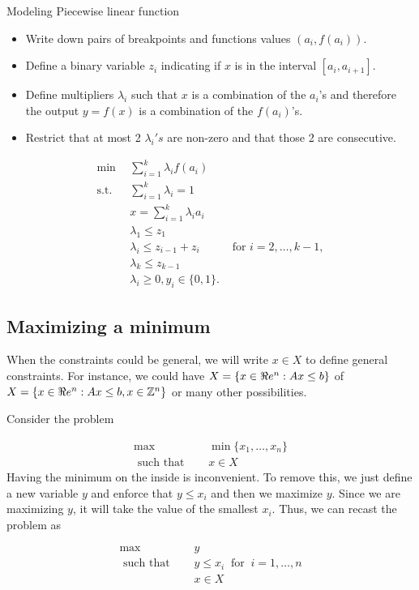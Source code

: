 {Modeling Piecewise linear function}
{\begin{itemize}
\item Write down pairs of breakpoints and functions values $(a_i, f(a_i))$.
\item Define a binary variable $z_i$ indicating if $x$ is in the interval $[a_i, a_{i+1}]$.
\item Define multipliers $\lambda_i$ such that $x$ is a combination of the $a_i$'s and therefore the output $y = f(x)$ is a combination of the $f(a_i)$'s.
\item Restrict that at most 2 $\lambda_i's$ are non-zero and that those 2 are consecutive.

\end{itemize}

\begin{align*}
\min \ \ & \sum_{i=1}^k \lambda_i f(a_i)\\
\text{s.t.} \ \ &  \sum_{i=1}^k \lambda_i = 1\\
& x = \sum_{i=1}^k \lambda_i a_i\\
& \lambda_1 \leq z_1\\
& \lambda_i \leq z_{i-1} + z_{i} & \text{ for }  i=2, \dots, k-1,\\
& \lambda_k \leq z_{k-1}\\
& \lambda_i \geq 0, y_i \in \{0,1\}.
\end{align*}

\subsection{Maximizing a minimum}
When the constraints could be general, we will write $x \in X$ to define general constraints.  For instance, we could have $X = \{ x \in \Re e^n : Ax \leq b\}$ of $X  = \{ x \in \Re e^n : Ax \leq b, x \in {\mathbb{Z}}^n\}$ or many other possibilities.  


Consider the problem 

\begin{align*}
\max   \quad & \min \{x_1, \dots, x_n\}\\
\text{ such that } \quad &  x \in X
\end{align*}
Having the minimum on the inside is inconvenient.  To remove this, we just define a new variable $y$ and enforce that $y \leq x_i$ and then we maximize $y$.  Since we are maximizing $y$, it will take the value of the smallest $x_i$.  Thus, we can recast the problem as

\begin{align*}
\max\quad    & y\\
\text{ such that } \quad  & y \leq x_i \ \text{ for }\  i=1, \dots, n \\
&  x \in X
\end{align*}


}
